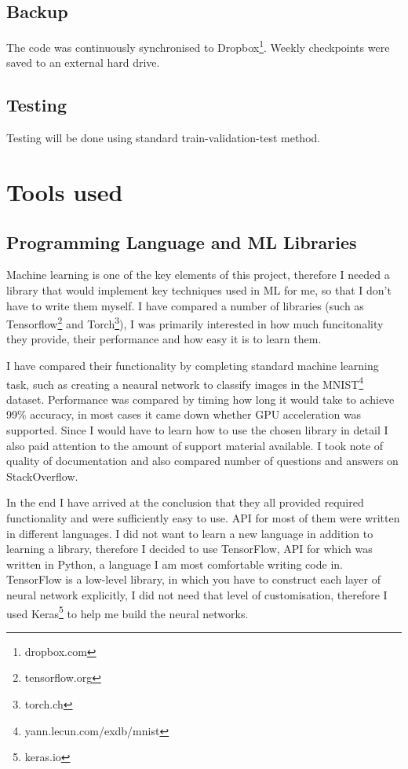 \documentclass[12pt,a4paper]{book}
\begin{document}
\subsection{Backup}
The code was continuously synchronised to Dropbox\footnote{dropbox.com}.
Weekly checkpoints were saved to an external hard drive.
\subsection{Testing}
Testing will be done using standard train-validation-test method.
\section{Tools used}
\subsection{Programming Language and ML Libraries}
Machine learning is one of the key elements of this project, therefore I needed a library that would implement key techniques used in ML for me, so that I don't have to write them myself.
I have compared a number of libraries (such as Tensorflow\footnote{tensorflow.org} and Torch\footnote{torch.ch}), I was primarily interested in how much funcitonality they provide, their performance and how easy it is to learn them.

I have compared their functionality by completing standard machine learning task, such as creating a neaural network to classify images in the MNIST\footnote{yann.lecun.com/exdb/mnist} dataset.
Performance was compared by timing how long it would take to achieve 99\% accuracy, in most cases it came down whether GPU acceleration was supported.
Since I would have to learn how to use the chosen library in detail I also paid attention to the amount of support material available.
I took note of quality of documentation and also compared number of questions and answers on StackOverflow.

In the end I have arrived at the conclusion that they all provided required functionality and were sufficiently easy to use.
API for most of them were written in different languages.
I did not want to learn a new language in addition to learning a library, therefore I decided to use TensorFlow, API for which was written in Python, a language I am most comfortable writing code in.
TensorFlow is a low-level library, in which you have to construct each layer of neural network explicitly, I did not need that level of customisation, therefore I used Keras\footnote{keras.io} to help me build the neural networks.
\end{document}
